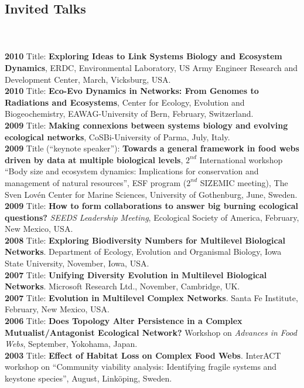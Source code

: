 \documentclass[12pt]{article}
\begin{document}
\begin{flushleft}
\begin{enumerate}
\section{Invited Talks}\\
\\
{\bf 2010} Title: {\bf Exploring Ideas to Link Systems Biology and Ecosystem Dynamics}, ERDC, Environmental Laboratory, US Army Engineer Research and Development Center, March, Vicksburg, USA.\\
{\bf 2010} Title: {\bf Eco-Evo Dynamics in Networks: From Genomes to Radiations and Ecosystems}, Center for Ecology, Evolution and Biogeochemistry, EAWAG-University of Bern, February, Switzerland.\\
{\bf 2009} Title: {\bf Making connexions between systems biology and evolving ecological networks}, CoSBi-University of Parma, July, Italy.\\
{\bf 2009} Title (``keynote speaker''): {\bf Towards a general framework in food webs driven by data at multiple biological levels}, $2^{nd}$ International workshop ``Body size and ecosystem dynamics: Implications for conservation and management of natural resources'', ESF program ($2^{nd}$ SIZEMIC meeting), The Sven Lov\'en Center for Marine Sciences, University of Gothenburg, June, Sweden.\\
{\bf 2009} Title: {\bf How to form collaborations to answer big burning ecological questions?} {\em SEEDS Leadership Meeting}, Ecological Society of America, February, New Mexico, USA.\\
{\bf 2008} Title: {\bf Exploring Biodiversity Numbers for Multilevel Biological Networks}. Department of Ecology, Evolution and Organismal Biology, Iowa State University, November, Iowa, USA.\\
{\bf 2007} Title: {\bf Unifying Diversity Evolution in Multilevel Biological Networks}. Microsoft Research Ltd., November, Cambridge, UK.\\
{\bf 2007} Title: {\bf Evolution in Multilevel Complex Networks}. Santa Fe Institute, February, New Mexico, USA.\\
{\bf 2006} Title: {\bf Does Topology Alter Persistence in a Complex Mutualist/Antagonist Ecological Network?} Workshop on {\em Advances in Food Webs}, September, Yokohama, Japan.\\
{\bf 2003} Title: {\bf Effect of Habitat Loss on Complex Food Webs}. InterACT workshop on ``Community viability analysis: Identifying fragile systems and keystone species'', August, Link\"oping, Sweden.\\ 



\end{enumerate}
\end{flushleft}
\end{document}
